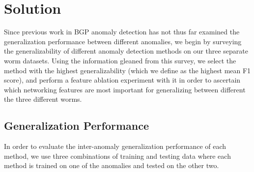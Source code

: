 
\section{Solution}
Since previous work in BGP anomaly detection has not thus far examined the generalization performance between different anomalies, we begin by surveying the generalizability of different anomaly detection methods on our three separate worm datasets. Using the information gleaned from this survey, we select the method with the highest generalizability (which we define as the highest mean F1 score), and perform a feature ablation experiment with it in order to ascertain which networking features are most important for generalizing between different the three different worms. 


\subsection{Generalization Performance}
In order to evaluate the inter-anomaly generalization performance of each method, we use three combinations of training and testing data where each method is trained on one of the anomalies and tested on the other two. 

